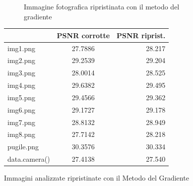 \begin{figure}[H]
\begin{subfigure}{0.5\textwidth}
        \caption{Immagine fotografica ripristinata con il metodo del gradiente}
    \end{subfigure}
\caption{Immagini analizzate ripristinate con il Metodo del Gradiente}
    \begin{minipage}{0.6\textwidth}\centering
        \begin{tabular}{|lcr|}
            \hline
            \rowcolor{orange}
            \multicolumn{1}{|c|}{\textbf{Immagine}} & \multicolumn{1}{l|}{\textbf{PSNR corrotte}} & \multicolumn{1}{c|}{\textbf{PSNR riprist.}} \\ \hline
            img1.png                                & 27.7886                                     & 28.217                                      \\
            img2.png                                & 29.2539                                     & 29.204                                      \\
            img3.png                                & 28.0014                                     & 28.525                                      \\
            img4.png                                & 29.6382                                     & 29.495                                      \\
            img5.png                                & 29.4566                                     & 29.362                                      \\
            img6.png                                & 29.1727                                     & 29.178                                      \\
            img7.png                                & 28.8132                                     & 28.949                                      \\
            img8.png                                & 27.7142                                     & 28.218                                      \\ \hline
            pugile.png                              & 30.3576                                     & 30.334                                      \\
            data.camera()                           & 27.4138                                     & 27.540                                      \\ \hline
            \end{tabular}
    \end{minipage}
\end{figure}


